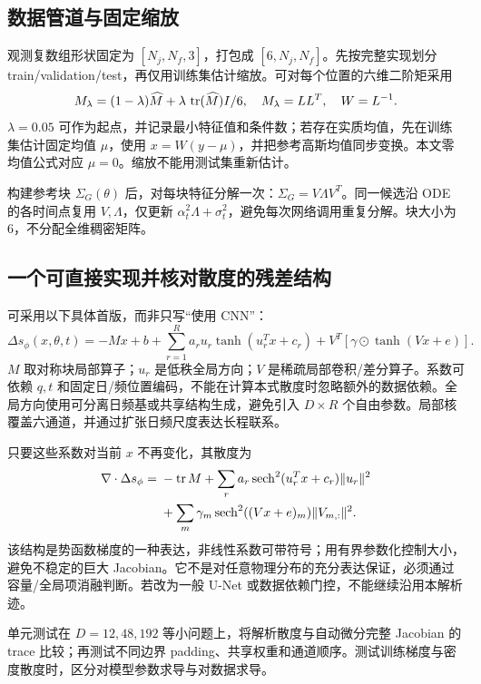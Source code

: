 \documentclass[UTF8,fontset=none,a4paper,11pt]{ctexart}
\begin{document}
\subsection{数据管道与固定缩放}
观测复数组形状固定为 $[N_j,N_f,3]$，打包成 $[6,N_j,N_f]$。先按完整实现划分 train/validation/test，再仅用训练集估计缩放。可对每个位置的六维二阶矩采用
\begin{equation}
M_\lambda=(1-\lambda)\widehat M+\lambda\,\operatorname{tr}(\widehat M)I/6,
\quad M_\lambda=LL^T,\quad W=L^{-1}.
\end{equation}
$\lambda=0.05$ 可作为起点，并记录最小特征值和条件数；若存在实质均值，先在训练集估计固定均值 $\mu$，使用 $x=W(y-\mu)$，并把参考高斯均值同步变换。本文零均值公式对应 $\mu=0$。缩放不能用测试集重新估计。
\par 构建参考块 $\Sigma_G(\theta)$ 后，对每块特征分解一次：$\Sigma_G=V\Lambda V^T$。同一候选沿 ODE 的各时间点复用 $V,\Lambda$，仅更新 $\alpha_t^2\Lambda+\sigma_t^2$，避免每次网络调用重复分解。块大小为 6，不分配全维稠密矩阵。
\subsection{一个可直接实现并核对散度的残差结构}
可采用以下具体首版，而非只写“使用 CNN”：
\begin{equation}
\Delta s_\phi(x,\theta,t)= -M x+b+
\sum_{r=1}^{R} a_r u_r\tanh(u_r^Tx+c_r)
+V^T[\gamma\odot\tanh(Vx+e)].
\end{equation}
$M$ 取对称块局部算子；$u_r$ 是低秩全局方向；$V$ 是稀疏局部卷积/差分算子。系数可依赖 $q,t$ 和固定日/频位置编码，不能在计算本式散度时忽略额外的数据依赖。全局方向使用可分离日频基或共享结构生成，避免引入 $D\times R$ 个自由参数。局部核覆盖六通道，并通过扩张日频尺度表达长程联系。
\par 只要这些系数对当前 $x$ 不再变化，其散度为
\begin{align}
\nabla\cdot\Delta s_\phi={}&-\operatorname{tr} M+
\sum_r a_r\operatorname{sech}^2(u_r^Tx+c_r)\|u_r\|^2\nonumber\\
&+\sum_m\gamma_m\operatorname{sech}^2((Vx+e)_m)\|V_{m,:}\|^2.
\end{align}
该结构是势函数梯度的一种表达，非线性系数可带符号；用有界参数化控制大小，避免不稳定的巨大 Jacobian。它不是对任意物理分布的充分表达保证，必须通过容量/全局项消融判断。若改为一般 U-Net 或数据依赖门控，不能继续沿用本解析迹。
\par 单元测试在 $D=12,48,192$ 等小问题上，将解析散度与自动微分完整 Jacobian 的 trace 比较；再测试不同边界 padding、共享权重和通道顺序。测试训练梯度与密度散度时，区分对模型参数求导与对数据求导。
\end{document}
